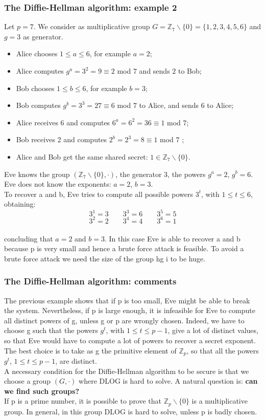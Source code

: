 \documentclass[a4paper, 10pt, titlepage]{article}
\begin{document}
\subsubsection*{The Diffie-Hellman algorithm: example 2}
Let $p = 7$. We consider as multiplicative group $G = \mathbb{Z}_7 \backslash \{0\} = \{1, 2, 3, 4, 5, 6\}$ and $g = 3$ as generator.
\begin{itemize}
\item Alice chooses $1 \leq a \leq 6$, for example $a = 2$;
\item Alice computes $g^a = 3^2 = 9 \equiv 2$ mod $7$ and sends $2$ to Bob;
\item Bob chooses $1 \leq b \leq 6$, for example $b = 3$;
\item Bob computes $g^b = 3^3 = 27 \equiv 6$ mod $7$ to Alice, and sends $6$ to Alice;
\item Alice receives 6 and computes $6^a = 6^2 = 36 \equiv 1$ mod $7$;
\item Bob receives 2 and computes $2^b = 2^3 = 8 \equiv 1$ mod $7$ ;
\item Alice and Bob get the same shared secret: $1 \in \mathbb{Z}_7 \backslash \{0\}$.
\end{itemize}
Eve knows the group $(\mathbb{Z}_7 \backslash \{0\}, \cdot)$, the generator 3, the powers $g^a = 2$, $g^b = 6$.\\
Eve does not know the exponents: $a = 2$, $b = 3$.\\
To recover a and b, Eve tries to compute all possible powers $3^t$, with $1 \leq t \leq 6$, obtaining:
$$3^1 = 3 \quad \quad 3^3 = 6 \quad \quad 3^5 = 5$$
$$3^2 = 2 \quad \quad 3^4 = 4 \quad \quad 3^6 = 1$$\\
concluding that $a = 2$ and $b = 3$.
In this case Eve is able to recover a and b because p is very small and hence a brute force attack is feasible. To avoid a brute force attack we need the size of the group hg i to be huge.

\subsubsection*{The Diffie-Hellman algorithm: comments}
The previous example shows that if p is too small, Eve might be able to break the system. Nevertheless, if p is large enough, it is infeasible for Eve to compute all distinct powers of g, unless g or p are wrongly chosen. Indeed, we have to choose g such that the powers $g^t$, with $1 \leq t \leq p - 1$, give a lot of distinct values, so that Eve would have to compute a lot of powers to recover a secret exponent. The best choice is to take as g the primitive element of $\mathbb{Z}_p$, so that all the powers $g^t$, $1 \leq t \leq p - 1$, are distinct.\\
A necessary condition for the Diffie-Hellman algorithm to be secure is that we choose a group $(G, \cdot)$ where DLOG is hard to solve.
A natural question is: \textbf{can we find such groups?}\\
If p is a prime number, it is possible to prove that $\mathbb{Z}_p \backslash \{0\}$ is a multiplicative group. In general, in this group DLOG is hard to solve, unless p is badly chosen.
\end{document}

